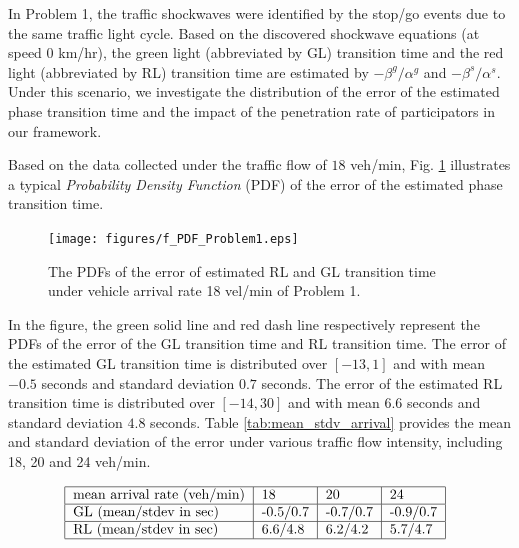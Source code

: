 \documentclass[final,oneside,onecolumn,12pt,a4paper]{book}%
\begin{document}
In Problem 1, the traffic shockwaves were identified by the stop/go events due
to the same traffic light cycle. Based on the discovered shockwave equations
(at speed $0$ km/hr), the green light (abbreviated by GL) transition time and
the red light (abbreviated by RL) transition time are estimated by $-\beta
^{g}/\alpha^{g}$ and $-\beta^{s}/\alpha^{s}$. Under this scenario, we
investigate the distribution of the error of the estimated phase transition
time and the impact of the penetration rate of participators in our framework.

Based on the data collected under the traffic flow of $18$ veh/min, Fig.
\ref{fig:f_PDF_Problem1} illustrates a typical \emph{Probability Density
Function} (PDF) of the error of the estimated phase transition time.
\begin{figure}[th]
\centerline{\texttt{[image: figures/f\_PDF\_Problem1.eps]}} \hfill\caption{The PDFs of the error of
estimated RL and GL transition time under vehicle arrival rate 18 vel/min of
Problem 1.}%
\label{fig:f_PDF_Problem1}%
\end{figure}In the figure, the green solid line and red dash line respectively
represent the PDFs of the error of the GL transition time and RL transition
time. The error of the estimated GL transition time is distributed over
$\left[  -13,1\right]  $ and with mean $-0.5$ seconds and standard deviation
$0.7$ seconds. The error of the estimated RL transition time is distributed
over $\left[  -14,30\right]  $ and with mean $6.6$ seconds and standard
deviation $4.8$ seconds. Table \ref{tab:mean_stdv_arrival} provides the mean
and standard deviation of the error under various traffic flow intensity,
including 18, 20 and 24 veh/min.\begin{table}[ptb]
\caption{The mean and standard deviation of the error of estimated phase
transition time under different vehicle arrival rates.}%
\label{tab:mean_stdv_arrival}%
\[%
\begin{tabular}
[c]{|l|l|l|l|}\hline
mean arrival rate (veh/min) & 18 & 20 & 24\\\hline
GL (mean/stdev in sec) & -0.5/0.7 & -0.7/0.7 & -0.9/0.7\\\hline
RL (mean/stdev in sec) & 6.6/4.8 & 6.2/4.2 & 5.7/4.7\\\hline
\end{tabular}
\ \
\]
\end{table}
\end{document}
